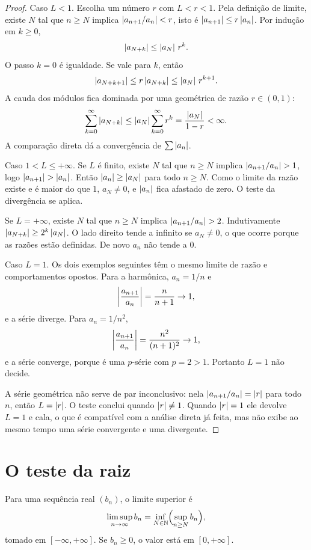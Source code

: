 \documentclass[11pt,a4paper]{article}
\begin{document}
\begin{proof}
Caso \(L<1\). Escolha um número \(r\) com \(L<r<1\). Pela definição de limite, existe \(N\) tal que \(n\ge N\) implica \(\left\lvert a_{n+1}/a_n \right\rvert<r\), isto é \(\left\lvert a_{n+1} \right\rvert\le r\left\lvert a_n \right\rvert\). Por indução em \(k\ge 0\),
\[
\left\lvert a_{N+k} \right\rvert\le\left\lvert a_N \right\rvert\,r^k.
\]
O passo \(k=0\) é igualdade. Se vale para \(k\), então
\[
\left\lvert a_{N+k+1} \right\rvert\le r\left\lvert a_{N+k} \right\rvert\le\left\lvert a_N \right\rvert\,r^{k+1}.
\]
A cauda dos módulos fica dominada por uma geométrica de razão \(r\in(0,1)\):
\[
\sum_{k=0}^{\infty}\left\lvert a_{N+k} \right\rvert
\le\left\lvert a_N \right\rvert\sum_{k=0}^{\infty} r^k
=\frac{\left\lvert a_N \right\rvert}{1-r}<\infty.
\]
A comparação direta dá a convergência de \(\sum\left\lvert a_n \right\rvert\).

Caso \(1<L\le+\infty\). Se \(L\) é finito, existe \(N\) tal que \(n\ge N\) implica \(\left\lvert a_{n+1}/a_n \right\rvert>1\), logo \(\left\lvert a_{n+1} \right\rvert>\left\lvert a_n \right\rvert\). Então \(\left\lvert a_n \right\rvert\ge\left\lvert a_N \right\rvert\) para todo \(n\ge N\). Como o limite da razão existe e é maior do que \(1\), \(a_N\neq 0\), e \(\left\lvert a_n \right\rvert\) fica afastado de zero. O teste da divergência se aplica.

Se \(L=+\infty\), existe \(N\) tal que \(n\ge N\) implica \(\left\lvert a_{n+1}/a_n \right\rvert>2\). Indutivamente \(\left\lvert a_{N+k} \right\rvert\ge 2^k\left\lvert a_N \right\rvert\). O lado direito tende a infinito se \(a_N\neq 0\), o que ocorre porque as razões estão definidas. De novo \(a_n\) não tende a \(0\).

Caso \(L=1\). Os dois exemplos seguintes têm o mesmo limite de razão e comportamentos opostos. Para a harmônica, \(a_n=1/n\) e
\[
\left\lvert \frac{a_{n+1}}{a_n} \right\rvert=\frac{n}{n+1}\to 1,
\]
e a série diverge. Para \(a_n=1/n^2\),
\[
\left\lvert \frac{a_{n+1}}{a_n} \right\rvert=\frac{n^2}{(n+1)^2}\to 1,
\]
e a série converge, porque é uma \(p\)-série com \(p=2>1\). Portanto \(L=1\) não decide.

A série geométrica não serve de par inconclusivo: nela \(\left\lvert a_{n+1}/a_n \right\rvert=\left\lvert r \right\rvert\) para todo \(n\), então \(L=\left\lvert r \right\rvert\). O teste conclui quando \(\left\lvert r \right\rvert\neq 1\). Quando \(\left\lvert r \right\rvert=1\) ele devolve \(L=1\) e cala, o que é compatível com a análise direta já feita, mas não exibe ao mesmo tempo uma série convergente e uma divergente.
\end{proof}

\section{O teste da raiz}

\begin{definicao}
Para uma sequência real \((b_n)\), o limite superior é
\[
\limsup_{n\to\infty} b_n=\inf_{N\in\mathbb{N}}\Bigl(\sup_{n\ge N} b_n\Bigr),
\]
tomado em \([-\infty,+\infty]\). Se \(b_n\ge 0\), o valor está em \([0,+\infty]\).
\end{definicao}
\end{document}

